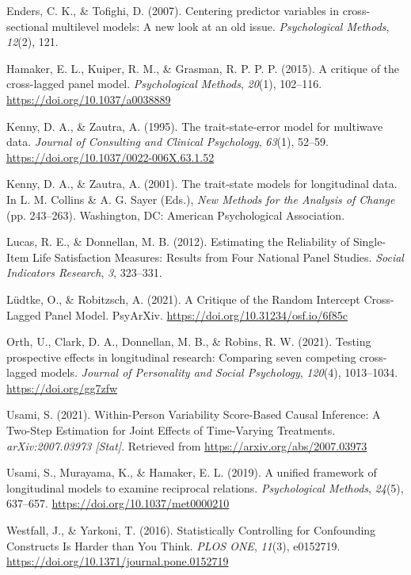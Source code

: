 \documentclass[
  english,
  man,floatsintext]{apa6}
\newlength{\cslhangindent}
\newlength{\cslentryspacingunit} %
\newenvironment{CSLReferences}[2] %
 {%
  \setlength{\parindent}{0pt}
  \ifodd #1
  \let\oldpar\par
  \def\par{\hangindent=\cslhangindent\oldpar}
  \fi
  \setlength{\parskip}{#2\cslentryspacingunit}
 }%
 {}
\begin{document}
\hypertarget{refs}{}
\begin{CSLReferences}{1}{0}
\leavevmode{}%
Enders, C. K., \& Tofighi, D. (2007). Centering predictor variables in cross-sectional multilevel models: {A} new look at an old issue. \emph{Psychological Methods}, \emph{12}(2), 121.

\leavevmode{}%
Hamaker, E. L., Kuiper, R. M., \& Grasman, R. P. P. P. (2015). A critique of the cross-lagged panel model. \emph{Psychological Methods}, \emph{20}(1), 102--116. \url{https://doi.org/10.1037/a0038889}

\leavevmode{}%
Kenny, D. A., \& Zautra, A. (1995). The trait-state-error model for multiwave data. \emph{Journal of Consulting and Clinical Psychology}, \emph{63}(1), 52--59. \url{https://doi.org/10.1037/0022-006X.63.1.52}

\leavevmode{}%
Kenny, D. A., \& Zautra, A. (2001). The trait-state models for longitudinal data. In L. M. Collins \& A. G. Sayer (Eds.), \emph{New {Methods} for the {Analysis} of {Change}} (pp. 243--263). {Washington, DC}: {American Psychological Association}.

\leavevmode{}%
Lucas, R. E., \& Donnellan, M. B. (2012). Estimating the {Reliability} of {Single-Item Life Satisfaction Measures}: {Results} from {Four National Panel Studies}. \emph{Social Indicators Research}, \emph{3}, 323--331.

\leavevmode{}%
Lüdtke, O., \& Robitzsch, A. (2021). A {Critique} of the {Random Intercept Cross-Lagged Panel Model}. {PsyArXiv}. \url{https://doi.org/10.31234/osf.io/6f85c}

\leavevmode{}%
Orth, U., Clark, D. A., Donnellan, M. B., \& Robins, R. W. (2021). Testing prospective effects in longitudinal research: {Comparing} seven competing cross-lagged models. \emph{Journal of Personality and Social Psychology}, \emph{120}(4), 1013--1034. \url{https://doi.org/gg7zfw}

\leavevmode{}%
Usami, S. (2021). Within-{Person Variability Score-Based Causal Inference}: {A Two-Step Estimation} for {Joint Effects} of {Time-Varying Treatments}. \emph{arXiv:2007.03973 {[}Stat{]}}. Retrieved from \url{https://arxiv.org/abs/2007.03973}

\leavevmode{}%
Usami, S., Murayama, K., \& Hamaker, E. L. (2019). A unified framework of longitudinal models to examine reciprocal relations. \emph{Psychological Methods}, \emph{24}(5), 637--657. \url{https://doi.org/10.1037/met0000210}

\leavevmode{}%
Westfall, J., \& Yarkoni, T. (2016). Statistically {Controlling} for {Confounding Constructs Is Harder} than {You Think}. \emph{PLOS ONE}, \emph{11}(3), e0152719. \url{https://doi.org/10.1371/journal.pone.0152719}

\end{CSLReferences}
\end{document}
